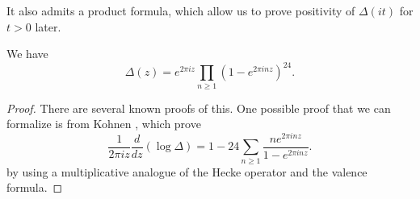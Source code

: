 It also admits a product formula, which allow us to prove positivity of $\Delta(it)$ for $t > 0$ later.
\begin{lemma}\label{lem-disc-prodformula}
We have
\begin{equation}\label{eqn-disc-prodformula}
\Delta(z) = e^{2 \pi i z} \prod_{n \ge 1} (1 - e^{2 \pi i n z})^{24}.
\end{equation}
\end{lemma}
\begin{proof}
There are several known proofs of this.
One possible proof that we can formalize is from Kohnen \cite{Kohnen}, which prove
\begin{equation}\label{eqn-disc-logder}
    \frac{1}{2\pi i z} \frac{d}{dz}(\log \Delta) = 1 - 24 \sum_{n \ge 1} \frac{ne^{2 \pi i n z}}{1 - e^{2 \pi i n z}}.
\end{equation}
by using a multiplicative analogue of the Hecke operator and the valence formula.
\end{proof}

